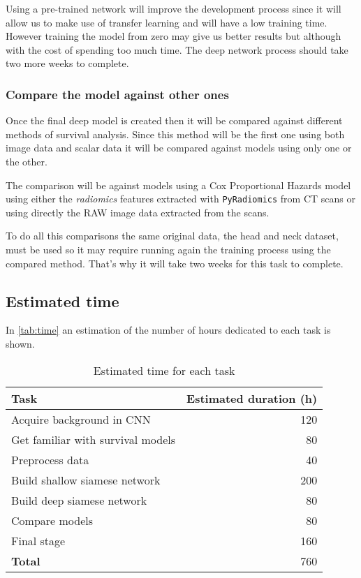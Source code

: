 Using a pre-trained network will improve the development process since it will allow us
to make use of transfer learning and will have a low training time. However training the model
from zero may give us better results but although with the cost of spending too much time.
The deep network process should take two more weeks to complete.

\subsubsection{Compare the model against other ones}

Once the final deep model is created then it will be compared against different methods of 
survival analysis. Since this method will be the first one using both image data and scalar 
data it will be compared against models using only one or the other. 

The comparison will be against models using a Cox Proportional Hazards model using either
the \emph{radiomics} features extracted with \texttt{PyRadiomics} from CT scans or using 
directly the RAW image data extracted from the scans.

To do all this comparisons the same original data, the head and neck dataset, must be 
used so it may require running again the training process using the compared method. 
That's why it will take two weeks for this task to complete.

\subsection{Estimated time}

In \autoref{tab:time} an estimation of the number of hours dedicated to each task is shown.

\begin{table}[H]
  \centering{}
  \begin{tabular}{|l|r|}
    \hline
    Task & Estimated duration (h) \\ \hline \hline
    Acquire background in CNN & 120 \\ \hline
    Get familiar with survival models & 80 \\ \hline
    Preprocess data & 40 \\ \hline
    Build shallow siamese network & 200 \\ \hline
    Build deep siamese network & 80 \\ \hline
    Compare models & 80 \\ \hline
    Final stage & 160 \\ 

  
    \hline \hline
    \textbf{Total} & 760 \\
    \hline
  \end{tabular}
  \caption{Estimated time for each task \label{tab:time}}
\end{table}

